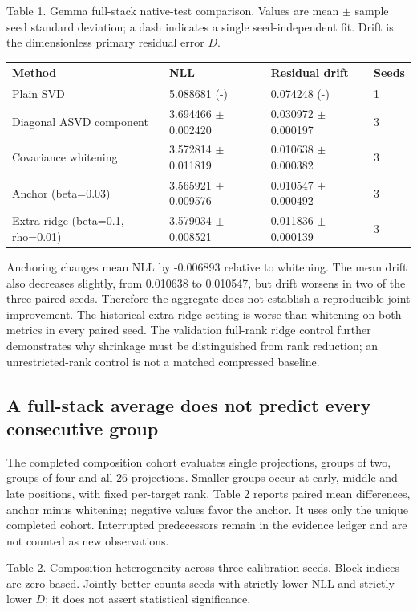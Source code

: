 \documentclass[10pt]{article}
\begin{document}
Table 1. Gemma full-stack native-test comparison. Values are mean \(\pm\) sample seed standard deviation; a dash indicates a single seed-independent fit. Drift is the dimensionless primary residual error $D$.

{\scriptsize\setlength{\tabcolsep}{2pt}
\begin{longtable}{p{}p{}p{}p{}}
Method & NLL & Residual drift & Seeds \\
\hline\endhead
Plain SVD & 5.088681 (-) & 0.074248 (-) & 1 \\
Diagonal ASVD component & 3.694466 \(\pm\) 0.002420 & 0.030972 \(\pm\) 0.000197 & 3 \\
Covariance whitening & 3.572814 \(\pm\) 0.011819 & 0.010638 \(\pm\) 0.000382 & 3 \\
Anchor (beta=0.03) & 3.565921 \(\pm\) 0.009576 & 0.010547 \(\pm\) 0.000492 & 3 \\
Extra ridge (beta=0.1, rho=0.01) & 3.579034 \(\pm\) 0.008521 & 0.011836 \(\pm\) 0.000139 & 3 \\
\end{longtable}}

Anchoring changes mean NLL by -0.006893 relative to whitening. The mean drift also decreases slightly, from 0.010638 to 0.010547, but drift worsens in two of the three paired seeds. Therefore the aggregate does not establish a reproducible joint improvement. The historical extra-ridge setting is worse than whitening on both metrics in every paired seed. The validation full-rank ridge control further demonstrates why shrinkage must be distinguished from rank reduction; an unrestricted-rank control is not a matched compressed baseline.


\subsection{A full-stack average does not predict every consecutive group}

The completed composition cohort evaluates single projections, groups of two, groups of four and all 26 projections. Smaller groups occur at early, middle and late positions, with fixed per-target rank. Table 2 reports paired mean differences, anchor minus whitening; negative values favor the anchor. It uses only the unique completed cohort. Interrupted predecessors remain in the evidence ledger and are not counted as new observations.

Table 2. Composition heterogeneity across three calibration seeds. Block indices are zero-based. Jointly better counts seeds with strictly lower NLL and strictly lower $D$; it does not assert statistical significance.
\end{document}
